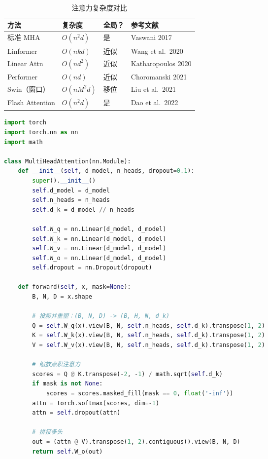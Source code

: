 \begin{table}[ht]
    \centering
    \caption{注意力复杂度对比}
    \begin{tabular}{L{3cm} L{3cm} L{3cm} L{3.5cm}}
        \toprule
        \textbf{方法} & \textbf{复杂度} & \textbf{全局？} & \textbf{参考文献} \\
        \midrule
        标准 MHA & $O(n^2 d)$ & 是 & Vaswani 2017 \\
        Linformer & $O(nk d)$ & 近似 & Wang et al.\ 2020 \\
        Linear Attn & $O(n d^2)$ & 近似 & Katharopoulos 2020 \\
        Performer & $O(n d)$ & 近似 & Choromanski 2021 \\
        Swin（窗口） & $O(n M^2 d)$ & 移位 & Liu et al.\ 2021 \\
        Flash Attention & $O(n^2 d)$ & 是 & Dao et al.\ 2022 \\
        \bottomrule
    \end{tabular}
\end{table}

\begin{code}
    \label{code:mha_pytorch}
\begin{lstlisting}[language=python]
import torch
import torch.nn as nn
import math

class MultiHeadAttention(nn.Module):
    def __init__(self, d_model, n_heads, dropout=0.1):
        super().__init__()
        self.d_model = d_model
        self.n_heads = n_heads
        self.d_k = d_model // n_heads
        
        self.W_q = nn.Linear(d_model, d_model)
        self.W_k = nn.Linear(d_model, d_model)
        self.W_v = nn.Linear(d_model, d_model)
        self.W_o = nn.Linear(d_model, d_model)
        self.dropout = nn.Dropout(dropout)
    
    def forward(self, x, mask=None):
        B, N, D = x.shape
        
        # 投影并重塑：(B, N, D) -> (B, H, N, d_k)
        Q = self.W_q(x).view(B, N, self.n_heads, self.d_k).transpose(1, 2)
        K = self.W_k(x).view(B, N, self.n_heads, self.d_k).transpose(1, 2)
        V = self.W_v(x).view(B, N, self.n_heads, self.d_k).transpose(1, 2)
        
        # 缩放点积注意力
        scores = Q @ K.transpose(-2, -1) / math.sqrt(self.d_k)
        if mask is not None:
            scores = scores.masked_fill(mask == 0, float('-inf'))
        attn = torch.softmax(scores, dim=-1)
        attn = self.dropout(attn)
        
        # 拼接多头
        out = (attn @ V).transpose(1, 2).contiguous().view(B, N, D)
        return self.W_o(out)
\end{lstlisting}
\end{code}

